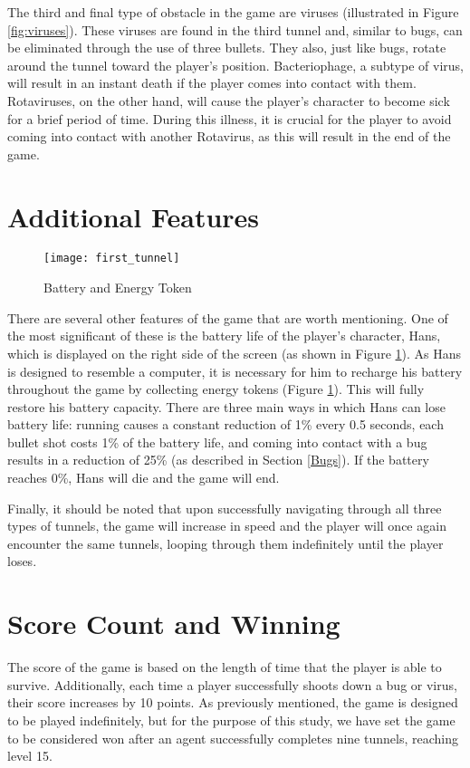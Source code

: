 The third and final type of obstacle in the game are viruses (illustrated in Figure \ref{fig:viruses}). These viruses are found in the third tunnel and, similar to bugs, can be eliminated through the use of three bullets. They also, just like bugs, rotate around the tunnel toward the player's position. Bacteriophage, a subtype of virus, will result in an instant death if the player comes into contact with them. Rotaviruses, on the other hand, will cause the player's character to become sick for a brief period of time. During this illness, it is crucial for the player to avoid coming into contact with another Rotavirus, as this will result in the end of the game.

\section{Additional Features}
\label{AdditionalFeatures}
\begin{figure}[h]
    \centering
    \texttt{[image: first\_tunnel]}
    \caption{Battery and Energy Token}
    \label{fig:batteryToken}
\end{figure}

There are several other features of the game that are worth mentioning. One of the most significant of these is the battery life of the player's character, Hans, which is displayed on the right side of the screen (as shown in Figure \ref{fig:batteryToken}). As Hans is designed to resemble a computer, it is necessary for him to recharge his battery throughout the game by collecting energy tokens (Figure \ref{fig:batteryToken}). This will fully restore his battery capacity. There are three main ways in which Hans can lose battery life: running causes a constant reduction of 1\% every 0.5 seconds, each bullet shot costs 1\% of the battery life, and coming into contact with a bug results in a reduction of 25\% (as described in Section \ref{Bugs}). If the battery reaches 0\%, Hans will die and the game will end.

Finally, it should be noted that upon successfully navigating through all three types of tunnels, the game will increase in speed and the player will once again encounter the same tunnels, looping through them indefinitely until the player loses.

\section{Score Count and Winning}
The score of the game is based on the length of time that the player is able to survive. Additionally, each time a player successfully shoots down a bug or virus, their score increases by 10 points. As previously mentioned, the game is designed to be played indefinitely, but for the purpose of this study, we have set the game to be considered won after an agent successfully completes nine tunnels, reaching level 15.
